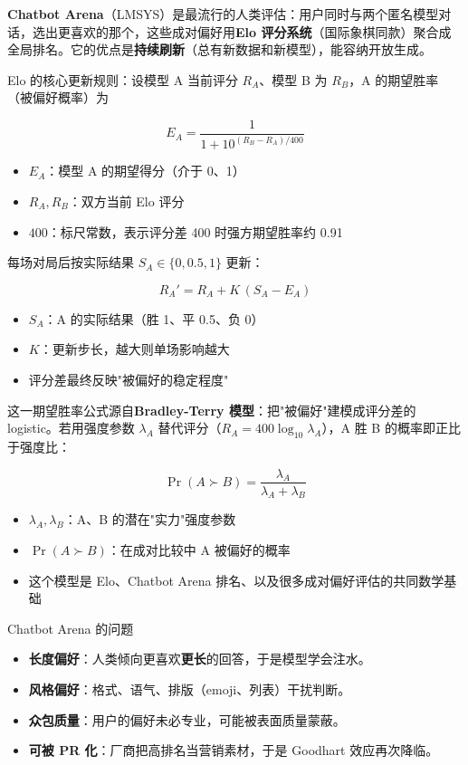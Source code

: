 \documentclass[a4paper]{article}
\begin{document}
\textbf{Chatbot Arena}（LMSYS）是最流行的人类评估：用户同时与两个匿名模型对话，选出更喜欢的那个，这些成对偏好用\textbf{Elo 评分系统}（国际象棋同款）聚合成全局排名。它的优点是\textbf{持续刷新}（总有新数据和新模型），能容纳开放生成。

Elo 的核心更新规则：设模型 A 当前评分 $R_A$、模型 B 为 $R_B$，A 的期望胜率（被偏好概率）为

\[
E_A = \frac{1}{1 + 10^{(R_B - R_A)/400}}
\]

\begin{itemize}
\item $E_A$：模型 A 的期望得分（介于 0、1）
\item $R_A, R_B$：双方当前 Elo 评分
\item $400$：标尺常数，表示评分差 400 时强方期望胜率约 0.91
\end{itemize}

每场对局后按实际结果 $S_A \in \{0, 0.5, 1\}$ 更新：

\[
R_A' = R_A + K\,(S_A - E_A)
\]

\begin{itemize}
\item $S_A$：A 的实际结果（胜 1、平 0.5、负 0）
\item $K$：更新步长，越大则单场影响越大
\item 评分差最终反映"被偏好的稳定程度"
\end{itemize}

这一期望胜率公式源自\textbf{Bradley-Terry 模型}：把"被偏好"建模成评分差的 logistic。若用强度参数 $\lambda_A$ 替代评分（$R_A = 400\log_{10}\lambda_A$），A 胜 B 的概率即正比于强度比：

\[
\Pr(A \succ B) = \frac{\lambda_A}{\lambda_A + \lambda_B}
\]

\begin{itemize}
\item $\lambda_A, \lambda_B$：A、B 的潜在"实力"强度参数
\item $\Pr(A \succ B)$：在成对比较中 A 被偏好的概率
\item 这个模型是 Elo、Chatbot Arena 排名、以及很多成对偏好评估的共同数学基础
\end{itemize}

\begin{warningbox}{Chatbot Arena 的问题}
\begin{itemize}
\item \textbf{长度偏好}：人类倾向更喜欢\textbf{更长}的回答，于是模型学会注水。
\item \textbf{风格偏好}：格式、语气、排版（emoji、列表）干扰判断。
\item \textbf{众包质量}：用户的偏好未必专业，可能被表面质量蒙蔽。
\item \textbf{可被 PR 化}：厂商把高排名当营销素材，于是 Goodhart 效应再次降临。
\end{itemize}
\end{warningbox}
\end{document}
